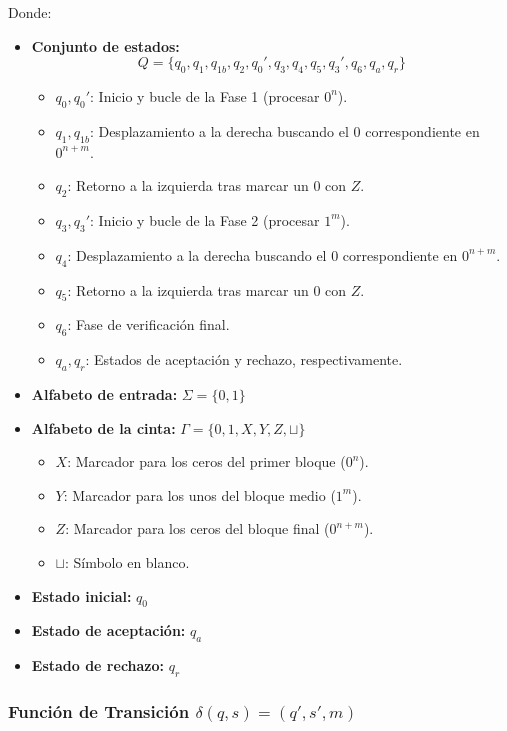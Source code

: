 Donde:
\begin{itemize}[leftmargin=*]
    \item \textbf{Conjunto de estados:}
    \[ Q = \{q_0, q_1, q_{1b}, q_2, q_0', q_3, q_4, q_5, q_3', q_6, q_a, q_r\} \]
    \begin{itemize}[leftmargin=*]
        \item $q_0, q_0'$: Inicio y bucle de la Fase 1 (procesar $0^n$).
        \item $q_1, q_{1b}$: Desplazamiento a la derecha buscando el $0$ correspondiente en $0^{n+m}$.
        \item $q_2$: Retorno a la izquierda tras marcar un $0$ con $Z$.
        \item $q_3, q_3'$: Inicio y bucle de la Fase 2 (procesar $1^m$).
        \item $q_4$: Desplazamiento a la derecha buscando el $0$ correspondiente en $0^{n+m}$.
        \item $q_5$: Retorno a la izquierda tras marcar un $0$ con $Z$.
        \item $q_6$: Fase de verificación final.
        \item $q_a, q_r$: Estados de aceptación y rechazo, respectivamente.
    \end{itemize}
    
    \item \textbf{Alfabeto de entrada:} $\Sigma = \{0, 1\}$
    
    \item \textbf{Alfabeto de la cinta:} $\Gamma = \{0, 1, X, Y, Z, \sqcup\}$
    \begin{itemize}[leftmargin=*]
        \item $X$: Marcador para los ceros del primer bloque ($0^n$).
        \item $Y$: Marcador para los unos del bloque medio ($1^m$).
        \item $Z$: Marcador para los ceros del bloque final ($0^{n+m}$).
        \item $\sqcup$: Símbolo en blanco.
    \end{itemize}
    
    \item \textbf{Estado inicial:} $q_0$
    \item \textbf{Estado de aceptación:} $q_a$
    \item \textbf{Estado de rechazo:} $q_r$
\end{itemize}

\subsubsection*{Función de Transición $\delta(q, s) = (q', s', m)$}

